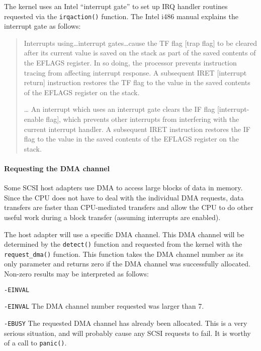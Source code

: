 The kernel uses an Intel ``interrupt gate'' to set up IRQ handler routines
requested via the \verb|irqaction()| function.  The Intel i486 manual
\cite[p.~9-11]{i486.manual} explains the interrupt gate as follows:

\begin{singlespace}
  \begin{quotation}
    Interrupts using\ldots interrupt gates\ldots cause the TF flag [trap
    flag] to be cleared after its current value is saved on the stack as
    part of the saved contents of the EFLAGS register.  In so doing, the
    processor prevents instruction tracing from affecting interrupt
    response.  A subsequent IRET [interrupt return] instruction restores
    the TF flag to the value in the saved contents of the EFLAGS register
    on the stack.

    \ldots{} An interrupt which uses an interrupt gate clears the IF flag
    [in\-ter\-rupt-enable flag], which prevents other interrupts from
    interfering with the current interrupt handler.  A subsequent IRET
    instruction restores the IF flag to the value in the saved contents of
    the EFLAGS register on the stack.
  \end{quotation}
\end{singlespace}

\paragraph{Requesting the DMA channel}

Some SCSI host adapters use DMA to access large blocks of data in memory.
Since the CPU does not have to deal with the individual DMA requests, data
transfers are faster than CPU-mediated transfers and allow the CPU to do
other useful work during a block transfer (assuming interrupts are
enabled).

The host adapter will use a specific DMA channel.  This DMA channel will be
determined by the \verb|detect()| function and requested from the kernel
with the \verb|request_dma()| function.  This function takes the DMA
channel number as its only parameter and returns zero if the DMA channel
was successfully allocated.  Non-zero results may be interpreted as
follows:
\begin{desc}{{\tt -EINVAL}}
\item[{\tt -EINVAL}] The DMA channel number requested was larger than 7.
\item[{\tt -EBUSY}] The requested DMA channel has already been allocated.
  This is a very serious situation, and will probably cause any SCSI
  requests to fail.  It is worthy of a call to \verb|panic()|.
\end{desc}



